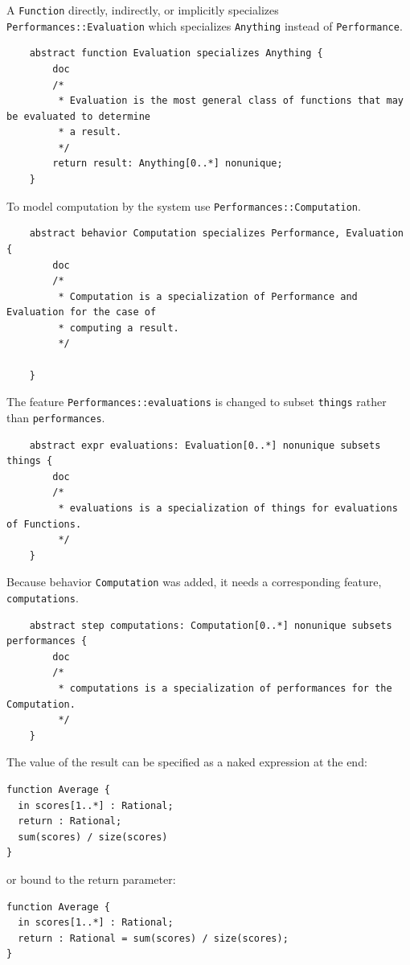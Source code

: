\pn A \texttt{Function} directly, indirectly, or implicitly specializes \texttt{Performances::Evaluation} which specializes \texttt{Anything}
instead of \texttt{Performance}.

\begin{lstlisting}
	abstract function Evaluation specializes Anything {
		doc
		/*
		 * Evaluation is the most general class of functions that may be evaluated to determine
		 * a result.
		 */
		return result: Anything[0..*] nonunique;
	}
\end{lstlisting}

\pn To model computation by the system use  \texttt{Performances::Computation}. 
\begin{lstlisting}
	abstract behavior Computation specializes Performance, Evaluation {
		doc
		/*
		 * Computation is a specialization of Performance and Evaluation for the case of
		 * computing a result.
		 */
			
	}
\end{lstlisting}

\pn The feature \texttt{Performances::evaluations} is changed to subset  \texttt{things} rather than  \texttt{performances}. 
\begin{lstlisting}
	abstract expr evaluations: Evaluation[0..*] nonunique subsets things {
		doc
		/*
		 * evaluations is a specialization of things for evaluations of Functions.
		 */
	}
\end{lstlisting}

\pn Because behavior \texttt{Computation} was added, it needs a corresponding feature, \texttt{computations}.
\begin{lstlisting}
	abstract step computations: Computation[0..*] nonunique subsets performances {
		doc
		/*
		 * computations is a specialization of performances for the Computation.
		 */
	}
\end{lstlisting}


\pn The value of the result can be specified as a naked expression at the end:

\begin{lstlisting}
function Average {
  in scores[1..*] : Rational; 
  return : Rational;
  sum(scores) / size(scores)
}
\end{lstlisting}

or bound to the return parameter:
\begin{lstlisting}
function Average {
  in scores[1..*] : Rational; 
  return : Rational = sum(scores) / size(scores);
}
\end{lstlisting}

%

